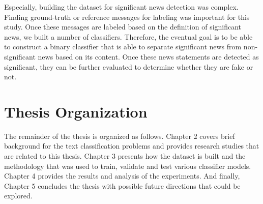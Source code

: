 Especially, building the dataset for significant news detection was complex. Finding ground-truth or reference messages for labeling was important for this study. Once these messages are labeled based on the definition of significant news, we built a number of classifiers. Therefore, the eventual goal is to be able to construct a binary classifier that is able to separate significant news from non-significant news based on its content. Once these news statements are detected as significant, they can be further evaluated to determine whether they are fake or not.

\section{Thesis Organization} \label{intro:organization}
The remainder of the thesis is organized as follows. Chapter 2 covers brief background for the text classification problems and provides research studies that are related to this thesis. Chapter 3 presents how the dataset is built and the methodology that was used to train, validate and test various classifier models. Chapter 4  provides the results and analysis of the experiments. And finally, Chapter 5 concludes the thesis with possible future directions that could be explored.
